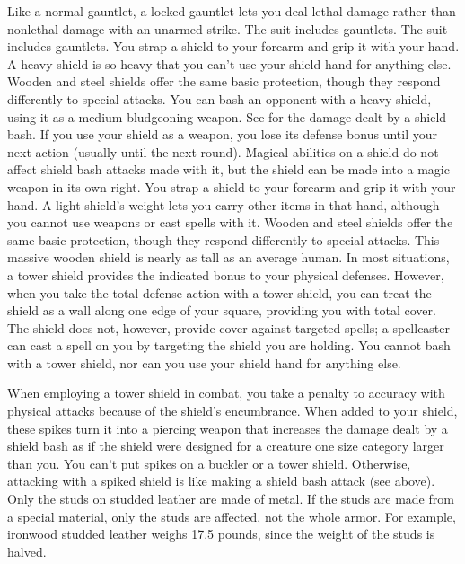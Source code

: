         Like a normal gauntlet, a locked gauntlet lets you deal lethal damage rather than nonlethal damage with an unarmed strike.
         The suit includes gauntlets.
         The suit includes gauntlets.
         You strap a shield to your forearm and grip it with your hand. A heavy shield is so heavy that you can't use your shield hand for anything else.
         Wooden and steel shields offer the same basic protection, though they respond differently to special attacks.
         You can bash an opponent with a heavy shield, using it as a medium bludgeoning weapon. See  for the damage dealt by a shield bash.  If you use your shield as a weapon, you lose its defense bonus until your next action (usually until the next round). Magical abilities on a shield do not affect shield bash attacks made with it, but the shield can be made into a magic weapon in its own right.
         You strap a shield to your forearm and grip it with your hand. A light shield's weight lets you carry other items in that hand, although you cannot use weapons or cast spells with it.
         Wooden and steel shields offer the same basic protection, though they respond differently to special attacks.
         This massive wooden shield is nearly as tall as an average human. In most situations, a tower shield provides the indicated bonus to your physical defenses. However, when you take the total defense action with a tower shield, you can treat the shield as a wall along one edge of your square, providing you with total cover. The shield does not, however, provide cover against targeted spells; a spellcaster can cast a spell on you by targeting the shield you are holding. You cannot bash with a tower shield, nor can you use your shield hand for anything else.

        When employing a tower shield in combat, you take a  penalty to accuracy with physical attacks because of the shield's encumbrance.
         When added to your shield, these spikes turn it into a piercing weapon that increases the damage dealt by a shield bash as if the shield were designed for a creature one size category larger than you. You can't put spikes on a buckler or a tower shield. Otherwise, attacking with a spiked shield is like making a shield bash attack (see above).
         Only the studs on studded leather are made of metal. If the studs are made from a special material, only the studs are affected, not the whole armor. For example, ironwood studded leather weighs 17.5 pounds, since the weight of the studs is halved.

